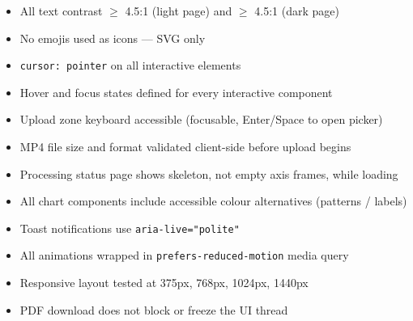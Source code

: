 \documentclass[12pt,a4paper]{article}
\begin{document}
\begin{itemize}[leftmargin=1.5em, label=\(\square\)]
  \item All text contrast $\geq$ 4.5:1 (light page) and $\geq$ 4.5:1 (dark page)
  \item No emojis used as icons — SVG only
  \item \texttt{cursor: pointer} on all interactive elements
  \item Hover and focus states defined for every interactive component
  \item Upload zone keyboard accessible (focusable, Enter/Space to open picker)
  \item MP4 file size and format validated client-side before upload begins
  \item Processing status page shows skeleton, not empty axis frames, while loading
  \item All chart components include accessible colour alternatives (patterns / labels)
  \item Toast notifications use \texttt{aria-live="polite"}
  \item All animations wrapped in \texttt{prefers-reduced-motion} media query
  \item Responsive layout tested at 375px, 768px, 1024px, 1440px
  \item PDF download does not block or freeze the UI thread
\end{itemize}
\end{document}
